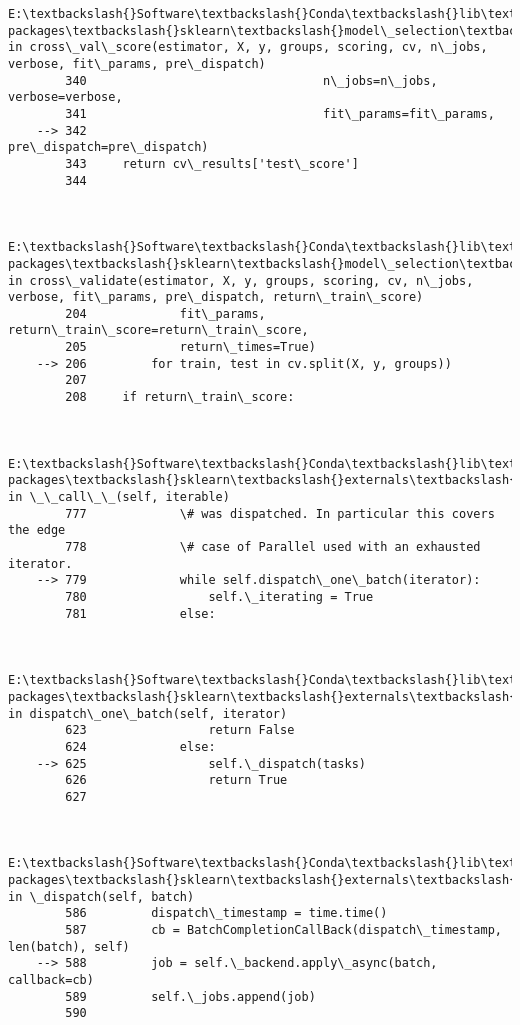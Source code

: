 \documentclass[11pt]{article}
\begin{document}
\begin{Verbatim}[commandchars=\\\{\}]
        E:\textbackslash{}Software\textbackslash{}Conda\textbackslash{}lib\textbackslash{}site-packages\textbackslash{}sklearn\textbackslash{}model\_selection\textbackslash{}\_validation.py in cross\_val\_score(estimator, X, y, groups, scoring, cv, n\_jobs, verbose, fit\_params, pre\_dispatch)
        340                                 n\_jobs=n\_jobs, verbose=verbose,
        341                                 fit\_params=fit\_params,
    --> 342                                 pre\_dispatch=pre\_dispatch)
        343     return cv\_results['test\_score']
        344 
    

        E:\textbackslash{}Software\textbackslash{}Conda\textbackslash{}lib\textbackslash{}site-packages\textbackslash{}sklearn\textbackslash{}model\_selection\textbackslash{}\_validation.py in cross\_validate(estimator, X, y, groups, scoring, cv, n\_jobs, verbose, fit\_params, pre\_dispatch, return\_train\_score)
        204             fit\_params, return\_train\_score=return\_train\_score,
        205             return\_times=True)
    --> 206         for train, test in cv.split(X, y, groups))
        207 
        208     if return\_train\_score:
    

        E:\textbackslash{}Software\textbackslash{}Conda\textbackslash{}lib\textbackslash{}site-packages\textbackslash{}sklearn\textbackslash{}externals\textbackslash{}joblib\textbackslash{}parallel.py in \_\_call\_\_(self, iterable)
        777             \# was dispatched. In particular this covers the edge
        778             \# case of Parallel used with an exhausted iterator.
    --> 779             while self.dispatch\_one\_batch(iterator):
        780                 self.\_iterating = True
        781             else:
    

        E:\textbackslash{}Software\textbackslash{}Conda\textbackslash{}lib\textbackslash{}site-packages\textbackslash{}sklearn\textbackslash{}externals\textbackslash{}joblib\textbackslash{}parallel.py in dispatch\_one\_batch(self, iterator)
        623                 return False
        624             else:
    --> 625                 self.\_dispatch(tasks)
        626                 return True
        627 
    

        E:\textbackslash{}Software\textbackslash{}Conda\textbackslash{}lib\textbackslash{}site-packages\textbackslash{}sklearn\textbackslash{}externals\textbackslash{}joblib\textbackslash{}parallel.py in \_dispatch(self, batch)
        586         dispatch\_timestamp = time.time()
        587         cb = BatchCompletionCallBack(dispatch\_timestamp, len(batch), self)
    --> 588         job = self.\_backend.apply\_async(batch, callback=cb)
        589         self.\_jobs.append(job)
        590 
    


\end{Verbatim}
\end{document}
